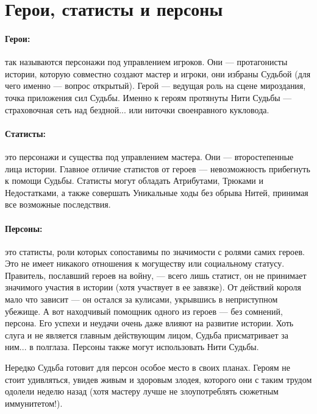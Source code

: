 \section{Герои, статисты и персоны}
\paragraph{Герои:} так называются персонажи под управлением игроков. Они — протагонисты истории, которую совместно создают мастер и игроки, они избраны Судьбой (для чего именно — вопрос открытый). Герой — ведущая роль на сцене мироздания, точка приложения сил Судьбы. Именно к героям протянуты Нити Судьбы — страховочная сеть над бездной... или ниточки своенравного кукловода.
\paragraph{Статисты:} это персонажи и существа под управлением мастера. Они — второстепенные лица истории. Главное отличие статистов от героев — невозможность прибегнуть к помощи Судьбы. Статисты могут обладать Атрибутами, Трюками и Недостатками, а также совершать Уникальные ходы без обрыва Нитей, принимая все возможные последствия.
\paragraph{Персоны:} это статисты, роли которых сопоставимы по значимости с ролями самих героев. Это не имеет никакого отношения к могуществу или социальному статусу. Правитель, пославший героев на войну, — всего лишь статист, он не принимает значимого участия в истории (хотя участвует в ее завязке). От действий короля мало что зависит — он остался за кулисами, укрывшись в неприступном убежище. А вот находчивый помощник одного из героев — без сомнений, персона. Его успехи и неудачи очень даже влияют на развитие истории. Хоть слуга и не является главным действующим лицом, Судьба присматривает за ним... в полглаза. Персоны также могут использовать Нити Судьбы.

\begin{tcolorbox}
    Нередко Судьба готовит для персон особое место в своих планах. Героям не стоит удивляться, увидев живым и здоровым злодея, которого они с таким трудом одолели неделю назад (хотя мастеру лучше не злоупотреблять сюжетным иммунитетом!).
\end{tcolorbox} 


